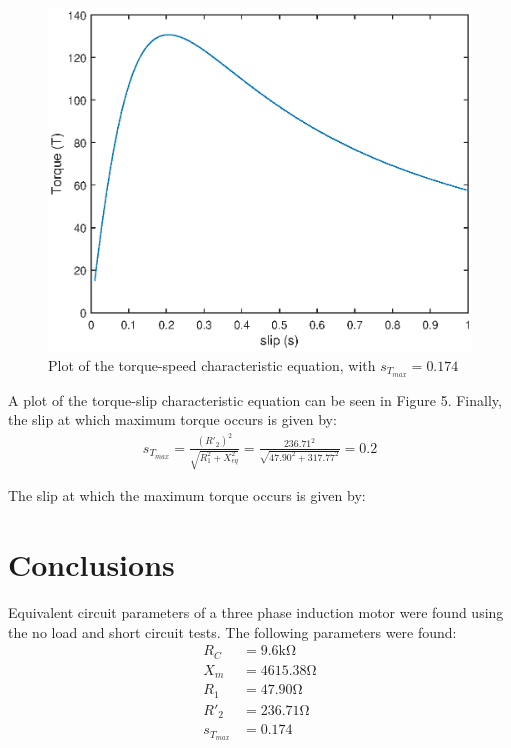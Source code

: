 \documentclass{article}
\begin{document}
\begin{figure}[H]
	\centering
	\includegraphics[scale=0.5]{fig2}
	\caption{Plot of the torque-speed characteristic equation, with $s_{T_{max}} = 0.174$}
\end{figure}

A plot of the torque-slip characteristic equation can be seen in Figure 5. Finally, the slip at which maximum torque occurs is given by:
\begin{align*}
	s_{T_{max}} = \frac{(R'_2)^2}{\sqrt{R_1^2 + X_{eq}^2}} = \frac{236.71^2}{\sqrt{47.90^2 + 317.77^2}} = 0.2
\end{align*}

The slip at which the maximum torque occurs is given by:
\begin{center}
\end{center}



\section{Conclusions}
Equivalent circuit parameters of a three phase induction motor were found using the no load and short circuit tests. The following parameters were found:
\begin{align*}
	R_C &= 9.6\si{\kilo\ohm}\\
	X_m &= 4615.38\si{\ohm}\\
	R_1 &= 47.90\si{\ohm}\\
	R'_2 &= 236.71\si{\ohm}\\
	s_{T_{max}} &= 0.174
\end{align*}
\end{document}
